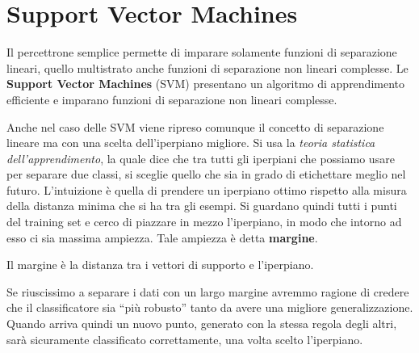 \chapter{Support Vector Machines}
Il percettrone semplice permette di imparare solamente funzioni di separazione lineari, quello multistrato anche funzioni di separazione non lineari complesse. Le \textbf{Support Vector Machines} (SVM) presentano un algoritmo di apprendimento efficiente e imparano funzioni di separazione non lineari complesse.

Anche nel caso delle SVM viene ripreso comunque il concetto di separazione lineare ma con una scelta dell'iperpiano migliore. Si usa la \textit{teoria statistica dell'apprendimento}, la quale dice che tra tutti gli iperpiani che possiamo usare per separare due classi, si sceglie quello che sia in grado di etichettare meglio nel futuro. L'intuizione è quella di prendere un iperpiano ottimo rispetto alla misura della distanza minima che si ha tra gli esempi. Si guardano quindi tutti i punti del training set e cerco di piazzare in mezzo l'iperpiano, in modo che intorno ad esso ci sia massima ampiezza. Tale ampiezza è detta \textbf{margine}.
\begin{definizione}
    Il margine è la distanza tra i vettori di supporto e l'iperpiano.
\end{definizione}

Se riuscissimo a separare i dati con un largo margine avremmo ragione di credere che il classificatore sia “più robusto” tanto da avere una migliore generalizzazione. Quando arriva quindi un nuovo punto, generato con la stessa regola degli altri, sarà sicuramente classificato correttamente, una volta scelto l'iperpiano.

